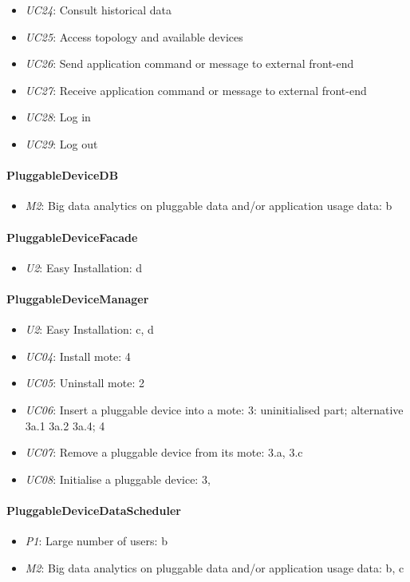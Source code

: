 \begin{itemize}
            \item \emph{UC24}: Consult historical data
            \item \emph{UC25}: Access topology and available devices
            \item \emph{UC26}: Send application command or message to external front-end
            \item \emph{UC27}: Receive application command or message to external front-end
            \item \emph{UC28}: Log in
            \item \emph{UC29}: Log out
        \end{itemize}

    \paragraph{PluggableDeviceDB}
        \begin{itemize}
            \item \emph{M2}: Big data analytics on pluggable data and/or application usage data: b
        \end{itemize}

    \paragraph{PluggableDeviceFacade}
        \begin{itemize}
        	\item \emph{U2}: Easy Installation: d
        \end{itemize}

    \paragraph{PluggableDeviceManager}
        \begin{itemize}
            \item \emph{U2}: Easy Installation: c, d
            \item \emph{UC04}: Install mote: 4
            \item \emph{UC05}: Uninstall mote: 2
            \item \emph{UC06}: Insert a pluggable device into a mote: 3: uninitialised part; alternative 3a.1 3a.2 3a.4; 4
            \item \emph{UC07}: Remove a pluggable device from its mote: 3.a, 3.c
            \item \emph{UC08}: Initialise a pluggable device: 3,
        \end{itemize}

    \paragraph{PluggableDeviceDataScheduler}
        \begin{itemize}
            \item \emph{P1}: Large number of users: b
            \item \emph{M2}: Big data analytics on pluggable data and/or application usage data: b, c
        \end{itemize}

